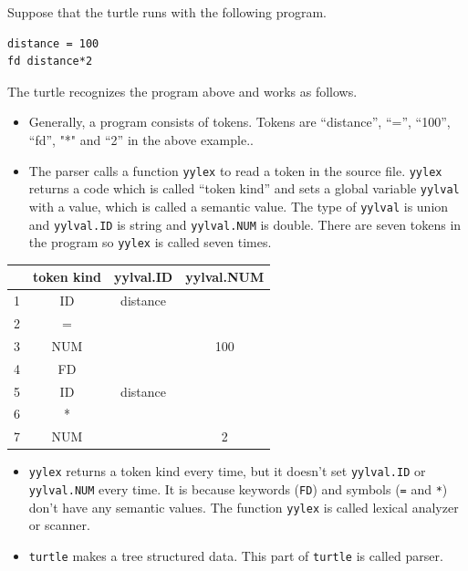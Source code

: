 Suppose that the turtle runs with the following program.

\begin{lstlisting}
distance = 100
fd distance*2
\end{lstlisting}

The turtle recognizes the program above and works as follows.

\begin{itemize}
\tightlist
\item
  Generally, a program consists of tokens. Tokens are ``distance'',
  ``='', ``100'', ``fd'', "*" and ``2'' in the above example..
\item
  The parser calls a function \passthrough{\lstinline!yylex!} to read a
  token in the source file. \passthrough{\lstinline!yylex!} returns a
  code which is called ``token kind'' and sets a global variable
  \passthrough{\lstinline!yylval!} with a value, which is called a
  semantic value. The type of \passthrough{\lstinline!yylval!} is union
  and \passthrough{\lstinline!yylval.ID!} is string and
  \passthrough{\lstinline!yylval.NUM!} is double. There are seven tokens
  in the program so \passthrough{\lstinline!yylex!} is called seven
  times.
\end{itemize}

\begin{longtable}[]{@{}cccc@{}}
\toprule
& token kind & yylval.ID & yylval.NUM\tabularnewline
\midrule
\endhead
1 & ID & distance &\tabularnewline
2 & = & &\tabularnewline
3 & NUM & & 100\tabularnewline
4 & FD & &\tabularnewline
5 & ID & distance &\tabularnewline
6 & * & &\tabularnewline
7 & NUM & & 2\tabularnewline
\bottomrule
\end{longtable}

\begin{itemize}
\tightlist
\item
  \passthrough{\lstinline!yylex!} returns a token kind every time, but
  it doesn't set \passthrough{\lstinline!yylval.ID!} or
  \passthrough{\lstinline!yylval.NUM!} every time. It is because
  keywords (\passthrough{\lstinline!FD!}) and symbols
  (\passthrough{\lstinline!=!} and \passthrough{\lstinline!*!}) don't
  have any semantic values. The function \passthrough{\lstinline!yylex!}
  is called lexical analyzer or scanner.
\item
  \passthrough{\lstinline!turtle!} makes a tree structured data. This
  part of \passthrough{\lstinline!turtle!} is called parser.
\end{itemize}

